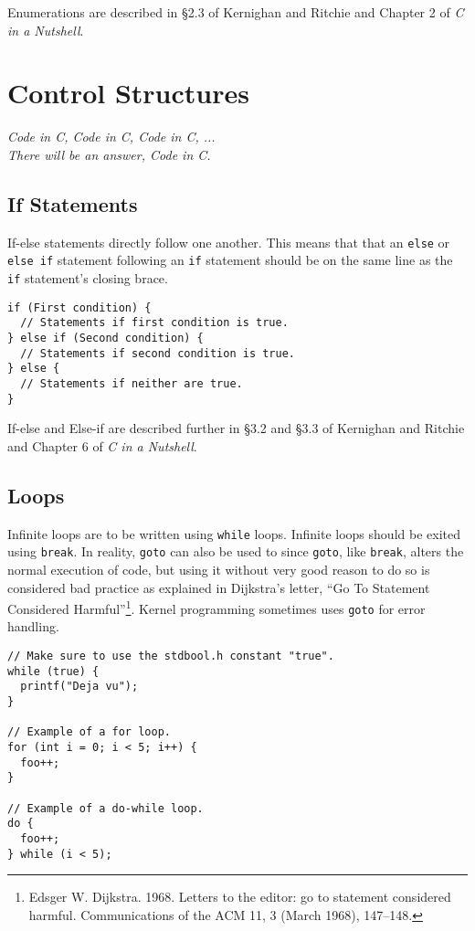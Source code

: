 \documentclass[11pt]{article}
\begin{document}
Enumerations are described in \S 2.3 of Kernighan and Ritchie and Chapter 2 of \emph{C in a Nutshell}.

\section{Control Structures}

\textwidth
\epigraph{\emph{Code in C, Code in C, Code in C, ...\\ There will be an answer, Code in C.}}{}

\subsection{If Statements}
If-else statements directly follow one another. This means that that an
\texttt{else} or \texttt{else if} statement following an \texttt{if} statement
should be on the same line as the \texttt{if} statement's closing brace.

\begin{lstlisting}
if (First condition) {
  // Statements if first condition is true.
} else if (Second condition) {
  // Statements if second condition is true.
} else {
  // Statements if neither are true.
}
\end{lstlisting}

If-else and Else-if are described further in \S 3.2 and \S 3.3 of Kernighan and
Ritchie and Chapter 6 of \emph{C in a Nutshell}.

\subsection{Loops}
Infinite loops are to be written using \texttt{while} loops. Infinite loops
should be exited using \texttt{break}. In reality, \texttt{goto} can also be
used to since \texttt{goto}, like \texttt{break}, alters the normal execution
of code, but using it without very good reason to do so is considered bad
practice as explained in Dijkstra's letter, ``Go To Statement Considered
Harmful''\footnote{Edsger W. Dijkstra. 1968. Letters to the editor: go to
statement considered harmful. Communications of the ACM 11, 3 (March 1968),
147--148.}.
Kernel programming sometimes uses \texttt{goto} for error handling.

\begin{lstlisting}
// Make sure to use the stdbool.h constant "true".
while (true) {
  printf("Deja vu");
}

// Example of a for loop.
for (int i = 0; i < 5; i++) {
  foo++;
}

// Example of a do-while loop.
do {
  foo++;
} while (i < 5);
\end{lstlisting}
\end{document}
